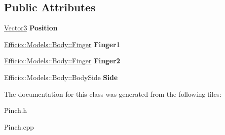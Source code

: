 \subsection*{Public Attributes}
\begin{DoxyCompactItemize}
\item 
\hyperlink{class_efficio_1_1_vector3}{Vector3} {\bfseries Position}\hypertarget{class_efficio_1_1_input_recognition_1_1_human_1_1_hands_1_1_pinch_aef25b5e89e91b9e9a7886a087c1b019f}{}\label{class_efficio_1_1_input_recognition_1_1_human_1_1_hands_1_1_pinch_aef25b5e89e91b9e9a7886a087c1b019f}

\item 
\hyperlink{class_efficio_1_1_models_1_1_body_1_1_finger}{Efficio\+::\+Models\+::\+Body\+::\+Finger} {\bfseries Finger1}\hypertarget{class_efficio_1_1_input_recognition_1_1_human_1_1_hands_1_1_pinch_a4ed288ec140ac43c76f4b4badf3d0876}{}\label{class_efficio_1_1_input_recognition_1_1_human_1_1_hands_1_1_pinch_a4ed288ec140ac43c76f4b4badf3d0876}

\item 
\hyperlink{class_efficio_1_1_models_1_1_body_1_1_finger}{Efficio\+::\+Models\+::\+Body\+::\+Finger} {\bfseries Finger2}\hypertarget{class_efficio_1_1_input_recognition_1_1_human_1_1_hands_1_1_pinch_a3eb061402a4ba055bf8239f955c7e618}{}\label{class_efficio_1_1_input_recognition_1_1_human_1_1_hands_1_1_pinch_a3eb061402a4ba055bf8239f955c7e618}

\item 
Efficio\+::\+Models\+::\+Body\+::\+Body\+Side {\bfseries Side}\hypertarget{class_efficio_1_1_input_recognition_1_1_human_1_1_hands_1_1_pinch_a14dc401031eefd57627fbf3a3ba1d860}{}\label{class_efficio_1_1_input_recognition_1_1_human_1_1_hands_1_1_pinch_a14dc401031eefd57627fbf3a3ba1d860}

\end{DoxyCompactItemize}


The documentation for this class was generated from the following files\+:\begin{DoxyCompactItemize}
\item 
Pinch.\+h\item 
Pinch.\+cpp\end{DoxyCompactItemize}
